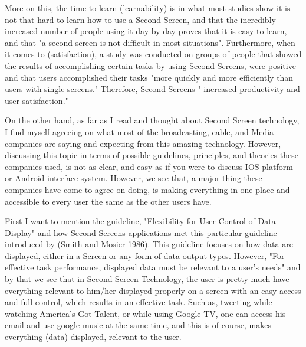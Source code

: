 \documentclass[12pt, oneside]{amsart}   	%
\begin{document}
 More on this, the time to learn (learnability) is in what most studies show it is not that hard to learn how to use a  Second Screen, and that the incredibly increased number of people using it day by day proves that it is easy to learn, and that "a second screen is not difficult in most situations"\cite{AdvDisv}.  Furthermore, when it comes to (satisfaction), a study was conducted on groups of people that showed the results of accomplishing certain tasks by using Second Screens, were positive and that users accomplished their tasks "more quickly and more 
efficiently than users with single screens."\cite{Dell} Therefore, Second Screens " increased productivity and user satisfaction."\cite{Dell} 

 On the other hand, as far as I read and thought about Second Screen technology, I find myself agreeing on what most of the broadcasting, cable, and Media companies are saying and expecting from this amazing technology.  However, discussing this topic in terms of possible guidelines, principles, and theories these companies used, is not as clear, and easy as if you were to discuss IOS platform or Android interface system.  However, we see that, a major thing these companies have come to agree on doing, is making everything in one place and accessible to every user the same as the other users have.

 First I want to mention the guideline, "Flexibility for User Control of Data Display" and how Second Screens applications met this particular guideline introduced by (Smith and Mosier 1986). %
This guideline focuses on how data are displayed, either in a Screen or any form of data output types.  However, "For effective task performance, displayed data must be relevant to a user's needs"\cite{Guideline} and by that we see that in Second Screen Technology, the user is pretty much have everything relevant to him/her displayed properly on a screen with an easy access and full control, which results in an effective task.  Such as, tweeting while watching America's Got Talent, or while using Google TV, one can access his email and use google music at the same time, and this is of course, makes everything (data) displayed, relevant to the user. 
\end{document}
